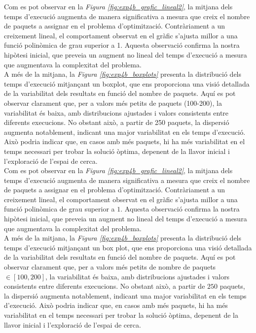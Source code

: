 \documentclass[a4paper]{article}
\begin{document}
	Com es pot observar en la \textit{Figura \ref{fig:exp4b_grafic_lineal2}}, la mitjana dels temps d'execució augmenta de manera significativa a mesura que creix el nombre de paquets a assignar en el problema d'optimització. Contràriament a un creixement lineal, el comportament observat en el gràfic s'ajusta millor a una funció polinòmica de grau superior a 1. Aquesta observació confirma la nostra hipòtesi inicial, que preveia un augment no lineal del temps d'execució a mesura que augmentava la complexitat del problema.\\
	A més de la mitjana, la \textit{Figura \ref{fig:exp4b_boxplots}} presenta la distribució dels temps d'execució mitjançant un boxplot, que ens proporciona una visió detallada de la variabilitat dels resultats en funció del nombre de paquets. Aquí es pot observar clarament que, per a valors més petits de paquets (100-200), la variabilitat és baixa, amb distribucions ajustades i valors consistents entre diferents execucions. No obstant això, a partir de 250 paquets, la dispersió augmenta notablement, indicant una major variabilitat en els temps d'execució. Això podria indicar que, en casos amb més paquets, hi ha més variabilitat en el temps necessari per trobar la solució òptima, depenent de la llavor inicial i l'exploració de l'espai de cerca.\\
	Com es pot observar en la \textit{Figura \ref{fig:exp4b_grafic_lineal2}}, la mitjana dels temps d'execució augmenta de manera significativa a mesura que creix el nombre de paquets a assignar en el problema d'optimització. Contràriament a un creixement lineal, el comportament observat en el gràfic s'ajusta millor a una funció polinòmica de grau superior a $1$. Aquesta observació confirma la nostra hipòtesi inicial, que preveia un augment no lineal del temps d'execució a mesura que augmentava la complexitat del problema. \\
	
	A més de la mitjana, la \textit{Figura \ref{fig:exp4b_boxplots}} presenta la distribució dels temps d'execució mitjançant un box plot, que ens proporciona una visió detallada de la variabilitat dels resultats en funció del nombre de paquets. Aquí es pot observar clarament que, per a valors més petits de nombre de paquets $\in [100, 200]$, la variabilitat és baixa, amb distribucions ajustades i valors consistents entre diferents execucions. No obstant això, a partir de $250$ paquets, la dispersió augmenta notablement, indicant una major variabilitat en els temps d'execució. Això podria indicar que, en casos amb més paquets, hi ha més variabilitat en el temps necessari per trobar la solució òptima, depenent de la llavor inicial i l'exploració de l'espai de cerca. \\
	
\end{document}
